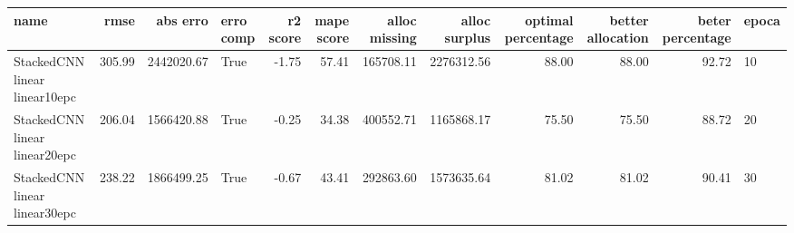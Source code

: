 \begin{tabular}{lrrlrrrrrrrl}
\toprule
name & rmse & abs erro & erro comp & r2 score & mape score & alloc missing & alloc surplus & optimal percentage & better allocation & beter percentage & epoca \\
\midrule
StackedCNN linear linear10epc & 305.99 & 2442020.67 & True & -1.75 & 57.41 & 165708.11 & 2276312.56 & 88.00 & 88.00 & 92.72 & 10 \\
StackedCNN linear linear20epc & 206.04 & 1566420.88 & True & -0.25 & 34.38 & 400552.71 & 1165868.17 & 75.50 & 75.50 & 88.72 & 20 \\
StackedCNN linear linear30epc & 238.22 & 1866499.25 & True & -0.67 & 43.41 & 292863.60 & 1573635.64 & 81.02 & 81.02 & 90.41 & 30 \\
\bottomrule
\end{tabular}
